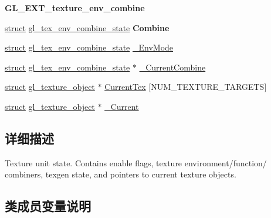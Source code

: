 \begin{Indent}\textbf{ G\+L\+\_\+\+E\+X\+T\+\_\+texture\+\_\+env\+\_\+combine}\par
\begin{DoxyCompactItemize}
\item 
\mbox{\label{structgl__texture__unit_a051ceccc6f0acfd01b37c8a63142064d}} 
\hyperlink{interfacestruct}{struct} \hyperlink{structgl__tex__env__combine__state}{gl\+\_\+tex\+\_\+env\+\_\+combine\+\_\+state} {\bfseries Combine}
\item 
\hyperlink{interfacestruct}{struct} \hyperlink{structgl__tex__env__combine__state}{gl\+\_\+tex\+\_\+env\+\_\+combine\+\_\+state} \hyperlink{structgl__texture__unit_abd8e87a4b0420a6b8043fab2eedd8a82}{\+\_\+\+Env\+Mode}
\item 
\hyperlink{interfacestruct}{struct} \hyperlink{structgl__tex__env__combine__state}{gl\+\_\+tex\+\_\+env\+\_\+combine\+\_\+state} $\ast$ \hyperlink{structgl__texture__unit_a388597ea29b69b6ea4d86f3557e6b1f5}{\+\_\+\+Current\+Combine}
\item 
\hyperlink{interfacestruct}{struct} \hyperlink{structgl__texture__object}{gl\+\_\+texture\+\_\+object} $\ast$ \hyperlink{structgl__texture__unit_af690bc7194923667d134f479ad6d747a}{Current\+Tex} \mbox{[}N\+U\+M\+\_\+\+T\+E\+X\+T\+U\+R\+E\+\_\+\+T\+A\+R\+G\+E\+TS\mbox{]}
\item 
\hyperlink{interfacestruct}{struct} \hyperlink{structgl__texture__object}{gl\+\_\+texture\+\_\+object} $\ast$ \hyperlink{structgl__texture__unit_a80d6bb086b878507d40ec6c815f78ac4}{\+\_\+\+Current}
\end{DoxyCompactItemize}
\end{Indent}


\subsection{详细描述}
Texture unit state. Contains enable flags, texture environment/function/ combiners, texgen state, and pointers to current texture objects. 

\subsection{类成员变量说明}
\mbox{\label{structgl__texture__unit_a80d6bb086b878507d40ec6c815f78ac4}} 
